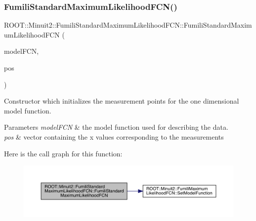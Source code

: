 \subsubsection{\texorpdfstring{FumiliStandardMaximumLikelihoodFCN()}{FumiliStandardMaximumLikelihoodFCN()}\hspace{0.1cm}{\footnotesize\ttfamily [1/4]}}
{\footnotesize\ttfamily R\+O\+O\+T\+::\+Minuit2\+::\+Fumili\+Standard\+Maximum\+Likelihood\+F\+C\+N\+::\+Fumili\+Standard\+Maximum\+Likelihood\+F\+CN (\begin{DoxyParamCaption}\item[{const \mbox{\hyperlink{classROOT_1_1Minuit2_1_1ParametricFunction}{Parametric\+Function}} \&}]{model\+F\+CN,  }\item[{const std\+::vector$<$ double $>$ \&}]{pos }\end{DoxyParamCaption})\hspace{0.3cm}{\ttfamily [inline]}}

Constructor which initializes the measurement points for the one dimensional model function.


\begin{DoxyParams}{Parameters}
{\em model\+F\+CN} & the model function used for describing the data.\\
\hline
{\em pos} & vector containing the x values corresponding to the measurements \\
\hline
\end{DoxyParams}
Here is the call graph for this function\+:
\nopagebreak
\begin{figure}[H]
\begin{center}
\leavevmode
\includegraphics[width=350pt]{dd/d40/classROOT_1_1Minuit2_1_1FumiliStandardMaximumLikelihoodFCN_af7dc80571b509a0a4f2f7ef821c3b1e6_cgraph}
\end{center}
\end{figure}
\mbox{\label{classROOT_1_1Minuit2_1_1FumiliStandardMaximumLikelihoodFCN_af233ad0d9ef029dd8aa6a145ea991483}} 
